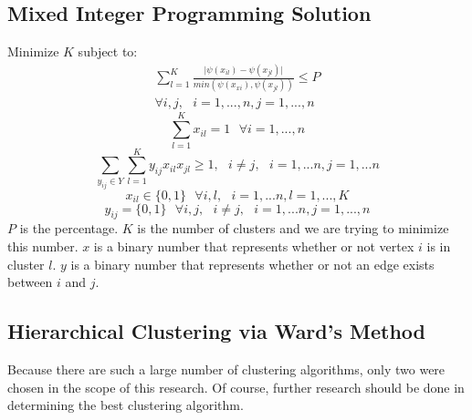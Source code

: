 \documentclass[conference]{IEEEtran}
\theoremstyle{plain}%
\begin{document}
\subsection{Mixed Integer Programming Solution}

Minimize $K$ subject to:
\begin{multline}
\sum_{l=1}^{K} \frac{\lvert \psi(x_{il})-\psi(x_{jl}) \rvert}{min(\psi(x_{xi}), \psi(x_{jl}) )} \leq P \\ \forall i,j, \text{ } i=1,...,n, j=1,...,n
\end{multline}
\begin{equation}
\sum_{l=1}^{K} x_{il} = 1 \text{ } \forall i = 1,...,n
\end{equation}
\begin{equation}
\sum_{y_{ij} \in Y} \sum_{l=1}^{K} y_{ij} x_{il} x_{jl} \geq 1, \text{ } i \neq j, \text{ } i = 1,...n, j = 1,...n
\end{equation}
\begin{equation}
x_{il} \in \{0,1\} \text{ } \forall i, l, \text{ } i = 1,...n, l=1,...,K
\end{equation}
\begin{equation}
y_{ij} = \{0,1\} \text{ } \forall i,j, \text{ } i \neq j, \text{ } i = 1,...n, j=1,...,n
\end{equation}
$P$ is the percentage. $K$ is the number of clusters and we are trying to minimize this number. $x$ is a binary number that represents whether or not vertex $i$ is in cluster $l$. $y$ is a binary number that represents whether or not an edge exists between $i$ and $j$.
\subsection{Hierarchical Clustering via Ward's Method}
Because there are such a large number of clustering algorithms, only two were chosen in the scope of this research. Of course, further research should be done in determining the best clustering algorithm.
\end{document}
